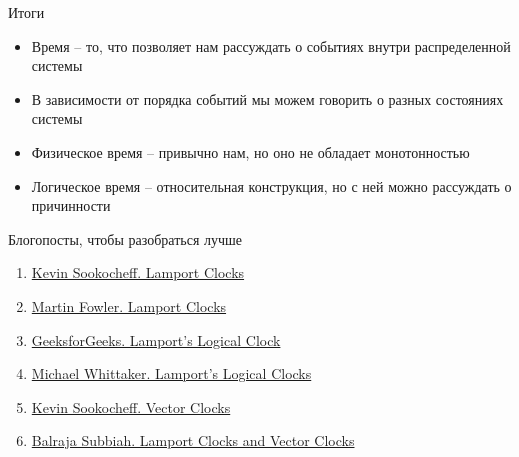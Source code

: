 \documentclass{beamer}
\begin{document}
\begin{frame}{Итоги}
\begin{itemize}
\item Время – то, что позволяет нам рассуждать о событиях внутри распределенной системы
\item В зависимости от порядка событий мы можем говорить о разных состояниях системы
\item Физическое время – привычно нам, но оно не обладает монотонностью
\item Логическое время – относительная конструкция, но с ней можно рассуждать о причинности
\end{itemize}
\end{frame}


\begin{frame}{Блогопосты, чтобы разобраться лучше}
\begin{enumerate}
\item \href{https://sookocheff.com/post/time/lamport-clock/}{Kevin Sookocheff. Lamport Clocks}
\item \href{https://martinfowler.com/articles/patterns-of-distributed-systems/lamport-clock.html}{Martin Fowler. Lamport Clocks}
\item \href{https://www.geeksforgeeks.org/dsa/lamports-logical-clock/}{GeeksforGeeks. Lamport's Logical Clock}
\item \href{https://mwhittaker.github.io/blog/lamports_logical_clocks/}{Michael Whittaker. Lamport's Logical Clocks}
\item \href{https://sookocheff.com/post/time/vector-clocks/}{Kevin Sookocheff. Vector Clocks}
\item \href{https://medium.com/@balrajasubbiah/lamport-clocks-and-vector-clocks-b713db1890d7}{Balraja Subbiah. Lamport Clocks and Vector Clocks}
\end{enumerate}
\end{frame}
\end{document}

